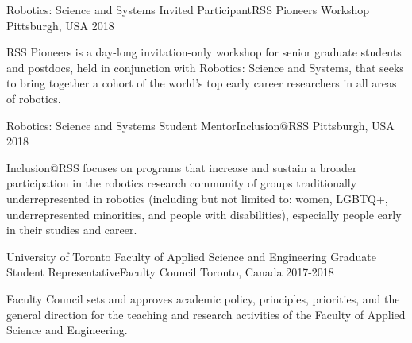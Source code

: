 

\begin{cventries} 

  \cventry
    {Robotics: Science and Systems} %
    {Invited Participant{\enskip\cdotp\enskip}RSS Pioneers Workshop} %
    {Pittsburgh, USA} %
    {2018} %
    {
      \begin{cvitems} %
        \item {RSS Pioneers is a day-long invitation-only workshop for senior graduate students and postdocs, held in conjunction with Robotics: Science and Systems, that seeks to bring together a cohort of the world’s top early career researchers in all areas of robotics.}
      \end{cvitems}
    }
    
  \cventry
    {Robotics: Science and Systems} %
    {Student Mentor{\enskip\cdotp\enskip}Inclusion@RSS} %
    {Pittsburgh, USA} %
    {2018} %
    {
      \begin{cvitems} %
        \item {Inclusion@RSS focuses on programs that increase and sustain a broader participation in the robotics research community of groups traditionally underrepresented in robotics (including but not limited to: women, LGBTQ+, underrepresented minorities, and people with disabilities), especially people early in their studies and career.}
      \end{cvitems}
    }

  \cventry
    {University of Toronto Faculty of Applied Science and Engineering} %
    {Graduate Student Representative{\enskip\cdotp\enskip}Faculty Council} %
    {Toronto, Canada} %
    {2017-2018} %
    {
      \begin{cvitems} %
        \item {Faculty Council sets and approves academic policy, principles, priorities, and the general direction for the teaching and research activities of the Faculty of Applied Science and Engineering.}
      \end{cvitems}
    }


\end{cventries}
